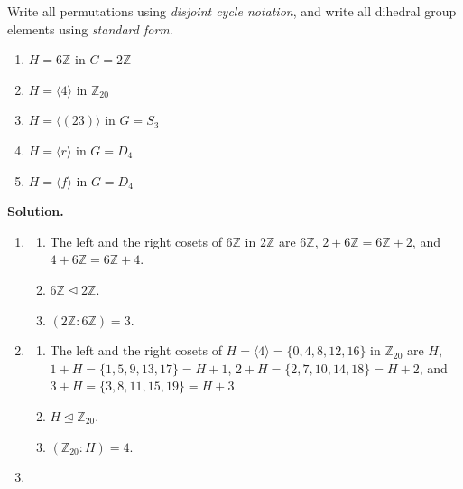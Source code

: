 \documentclass[10pt,]{book}
\theoremstyle{plain}
\theoremstyle{definition}
\theoremstyle{definition}
\theoremstyle{definition}
\theoremstyle{definition}
\numberwithin{equation}{section}
\def\Z{\mathbb{Z}}
\begin{document}
\begin{exerciselist}
Write all permutations using \emph{disjoint cycle notation}, and write all dihedral group elements using \emph{standard form}.%
\leavevmode%
\begin{enumerate}[label=(\alph*)]
\item\hypertarget{li-420}{}
            \(H=6\Z\) in \(G=2\Z\)
\item\hypertarget{li-421}{}
            \(H=\langle 4\rangle\) in \(\Z_{20}\)
\item\hypertarget{li-422}{}
            \(H=\langle (23)\rangle\) in \(G=S_3\)
\item\hypertarget{li-423}{}
            \(H=\langle r\rangle\) in \(G=D_4\)
\item\hypertarget{li-424}{}
            \(H=\langle f\rangle\) in \(G=D_4\)
\end{enumerate}
\par\smallskip
\par\smallskip
\noindent\textbf{Solution.}\hypertarget{solution-53}{}\quad
\leavevmode%
\begin{enumerate}[label=(\alph*)]
\item\hypertarget{li-425}{}%
\begin{enumerate}[label=\roman*.]
\item\hypertarget{li-426}{}
            The left and the right cosets of \(6\Z\) in \(2\Z\) are \(6\Z\), \(2+6\Z=6\Z+2\), and \(4+6\Z=6\Z+4\).
\item\hypertarget{li-427}{}
            \(6\Z \unlhd 2\Z\).
\item\hypertarget{li-428}{}
            \((2\Z:6\Z)=3\).
\end{enumerate}
%
\item\hypertarget{li-429}{}%
\begin{enumerate}[label=\roman*.]
\item\hypertarget{li-430}{}
            The left and the right cosets of \(H=\langle 4\rangle =\{0,4,8,12,16\}\) in \(\Z_{20}\) are \(H\), \(1+H=\{1,5,9,13,17\}=H+1\), \(2+H=\{2,7,10,14,18\}=H+2\), and \(3+H=\{3,8,11,15,19\}=H+3\).
\item\hypertarget{li-431}{}
            \(H \unlhd \Z_{20}\).
\item\hypertarget{li-432}{}
            \((\Z_{20}:H)=4\).
\end{enumerate}
%
\item\hypertarget{li-433}{}%
\begin{enumerate}[label=\roman*.]

\end{enumerate}
\end{enumerate}
\end{exerciselist}
\end{document}
